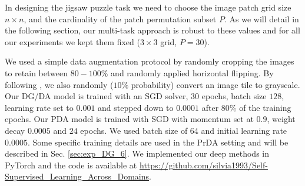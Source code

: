 In designing the jigsaw puzzle task we need to choose the image patch grid size $n \times n$, and the cardinality of the patch permutation subset $P$. 
As we will detail in the following section, our multi-task approach is robust to these values and for all our experiments we kept them fixed ($3 \times 3$ grid, $P=30$).

We used a simple data augmentation protocol by randomly cropping the images to retain between $80-100\%$ and randomly applied horizontal flipping. By following \cite{Noroozi_2018_CVPR}, we also randomly ($10\%$ probability) convert an image tile to grayscale.
Our DG/DA model is trained with an SGD solver, $30$ epochs, batch size $128$,  learning rate set to $0.001$ and stepped down to $0.0001$ after $80\%$ of the training epochs.
Our PDA model is trained with 
SGD with momentum set at $0.9$, weight decay  $0.0005$ and $24$ epochs. We used batch size of 64 and initial learning rate $0.0005$.
Some specific training details are used in the PrDA setting and will be  described in Sec. \ref{sec:exp_DG_6}.
We implemented our deep methods in PyTorch and the code is available at \url{https://github.com/silvia1993/Self-Supervised_Learning_Across_Domains}.



